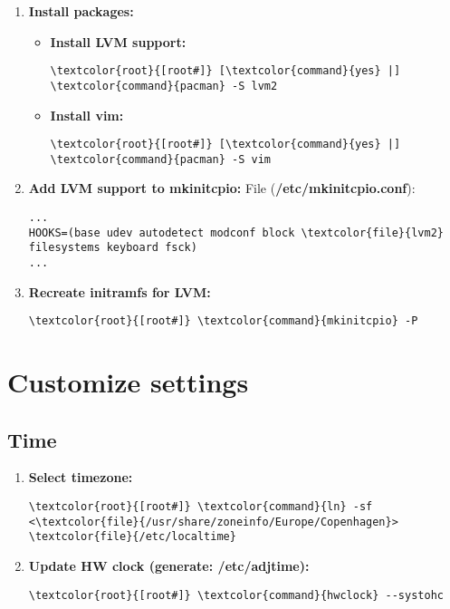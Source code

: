 \documentclass[10pt, a4paper, onecolumn, openany]{book} %
\begin{document}
\begin{enumerate}
    \item \textbf{Install packages:}
    \begin{itemize}
        \item \textbf{Install LVM support:}
\begin{Verbatim}[commandchars=\\\{\}]
\textcolor{root}{[root#]} [\textcolor{command}{yes} |] \textcolor{command}{pacman} -S lvm2
\end{Verbatim}
        \item \textbf{Install vim:}
\begin{Verbatim}[commandchars=\\\{\}]
\textcolor{root}{[root#]} [\textcolor{command}{yes} |] \textcolor{command}{pacman} -S vim
\end{Verbatim}
    \end{itemize}

    \item \textbf{Add LVM support to mkinitcpio:}
\newline File (\textbf{\textcolor{file}{/etc/mkinitcpio.conf}}):
\begin{Verbatim}[commandchars=\\\{\}]
...
HOOKS=(base udev autodetect modconf block \textcolor{file}{lvm2} filesystems keyboard fsck)
...
\end{Verbatim}

    \item \textbf{Recreate initramfs for LVM:}
\begin{Verbatim}[commandchars=\\\{\}]
\textcolor{root}{[root#]} \textcolor{command}{mkinitcpio} -P
\end{Verbatim}
\end{enumerate}
\section{Customize settings}
\subsection{Time}
\begin{enumerate}
    \item \textbf{Select timezone:}
\begin{Verbatim}[commandchars=\\\{\}]
\textcolor{root}{[root#]} \textcolor{command}{ln} -sf <\textcolor{file}{/usr/share/zoneinfo/Europe/Copenhagen}> \textcolor{file}{/etc/localtime}
\end{Verbatim}
        \item \textbf{Update HW clock (generate: /etc/adjtime):}
\begin{Verbatim}[commandchars=\\\{\}]
\textcolor{root}{[root#]} \textcolor{command}{hwclock} --systohc
\end{Verbatim}
\end{enumerate}
\end{document}
